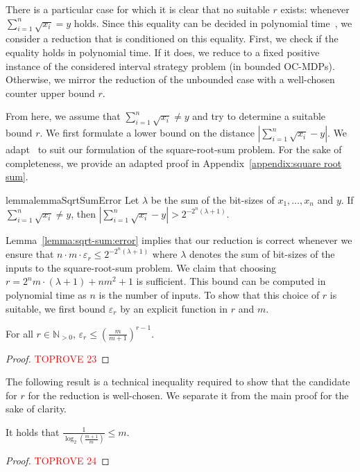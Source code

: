 \documentclass[a4paper,UKenglish,cleveref,autoref,thm-restate,colorlinks]{lipics-v2021}
\newcommand{\sqsx}{x} \newcommand{\sqsxVect}{\bar{x}} \newcommand{\sqsm}{m} \newcommand{\sqsy}{y} \newcommand{\sqsi}{i} \newcommand{\sqsn}{n} \newcommand{\sqsSize}{E}
\newcommand{\IN}{\mathbb{N}}
\newcommand{\INpos}{\IN_{>0}}
\newcommand{\counterUB}{r}
\newcommand{\eleError}[1]{\varepsilon_{#1}}
\begin{document}
There is a particular case for which it is clear that no suitable $\counterUB$ exists: whenever $\sum_{\sqsi=1}^\sqsn\sqrt{\sqsx_\sqsi} = \sqsy$ holds.
Since this equality can be decided in polynomial time~\cite{DBLP:journals/jsc/BorodinFHT85}, we consider a reduction that is conditioned on this equality.
First, we check if the equality holds in polynomial time.
If it does, we reduce to a fixed positive instance of the considered interval strategy problem (in bounded OC-MDPs).
Otherwise, we mirror the reduction of the unbounded case with a well-chosen counter upper bound $\counterUB$.

From here, we assume that $\sum_{\sqsi=1}^\sqsn\sqrt{\sqsx_\sqsi} \neq \sqsy$ and try to determine a suitable bound $\counterUB$.
We first formulate a lower bound on the distance $|\sum_{\sqsi=1}^\sqsn\sqrt{\sqsx_\sqsi} - \sqsy|$.
We adapt~\cite[Lemma~3]{DBLP:journals/jc/Tiwari92} to suit our formulation of the square-root-sum problem.
For the sake of completeness, we provide an adapted proof in Appendix~\ref{appendix:square root sum}.
\begin{restatable}{lemma}{lemmaSqrtSumError}\label{lemma:sqrt-sum:error}
  Let $\lambda$ be the sum of the bit-sizes of $\sqsx_1, \ldots, \sqsx_\sqsn$ and $\sqsy$.
  If $\sum_{\sqsi=1}^\sqsn\sqrt{\sqsx_\sqsi} \neq\sqsy$, then $|\sum_{\sqsi=1}^\sqsn\sqrt{\sqsx_\sqsi}  - \sqsy| > 2^{-2^{\sqsn}(\lambda+1)}$.
\end{restatable}

Lemma~\ref{lemma:sqrt-sum:error} implies that our reduction is correct whenever we ensure that $\sqsn\cdot\sqsm\cdot\eleError{\counterUB}\leq 2^{-2^{\sqsn}(\lambda+1)}$ where $\lambda$ denotes the sum of bit-sizes of the inputs to the square-root-sum problem.
We claim that choosing $\counterUB = 2^\sqsn\sqsm\cdot(\lambda+1)+\sqsn\sqsm^2+1$ is sufficient.
This bound can be computed in polynomial time as $\sqsn$ is the number of inputs.
To show that this choice of $\counterUB$ is suitable, we first bound $\eleError{\counterUB}$ by an explicit function in $\counterUB$ and $\sqsm$.

\begin{lemma}\label{lemma:sqrt-sum:bound:domination}
  For all $\counterUB\in\INpos$, $\eleError{\counterUB}\leq (\frac{\sqsm}{\sqsm+1})^{\counterUB-1}$.
\end{lemma}
\begin{proof}\textcolor{red}{TOPROVE 23}\end{proof}

The following result is a technical inequality required to show that the candidate for $\counterUB$ for the reduction is well-chosen.
We separate it from the main proof for the sake of clarity.
\begin{lemma}\label{lemma:sqrt-sum:bound:ub:inequality}
  It holds that $\frac{1}{\log_2(\frac{\sqsm+1}{\sqsm})}\leq\sqsm$.
\end{lemma}
\begin{proof}\textcolor{red}{TOPROVE 24}\end{proof}
\end{document}
